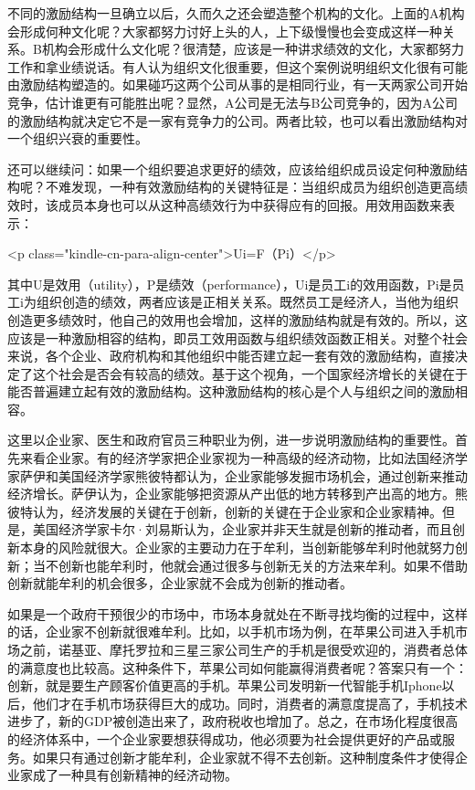 不同的激励结构一旦确立以后，久而久之还会塑造整个机构的文化。上面的A机构会形成何种文化呢？大家都努力讨好上头的人，上下级慢慢也会变成这样一种关系。B机构会形成什么文化呢？很清楚，应该是一种讲求绩效的文化，大家都努力工作和拿业绩说话。有人认为组织文化很重要，但这个案例说明组织文化很有可能由激励结构塑造的。如果碰巧这两个公司从事的是相同行业，有一天两家公司开始竞争，估计谁更有可能胜出呢？显然，A公司是无法与B公司竞争的，因为A公司的激励结构就决定它不是一家有竞争力的公司。两者比较，也可以看出激励结构对一个组织兴衰的重要性。

还可以继续问：如果一个组织要追求更好的绩效，应该给组织成员设定何种激励结构呢？不难发现，一种有效激励结构的关键特征是：当组织成员为组织创造更高绩效时，该成员本身也可以从这种高绩效行为中获得应有的回报。用效用函数来表示：

<p class="kindle-cn-para-align-center">Ui=F（Pi）</p>

其中U是效用（utility），P是绩效（performance），Ui是员工i的效用函数，Pi是员工i为组织创造的绩效，两者应该是正相关关系。既然员工是经济人，当他为组织创造更多绩效时，他自己的效用也会增加，这样的激励结构就是有效的。所以，这应该是一种激励相容的结构，即员工效用函数与组织绩效函数正相关。对整个社会来说，各个企业、政府机构和其他组织中能否建立起一套有效的激励结构，直接决定了这个社会是否会有较高的绩效。基于这个视角，一个国家经济增长的关键在于能否普遍建立起有效的激励结构。这种激励结构的核心是个人与组织之间的激励相容。

这里以企业家、医生和政府官员三种职业为例，进一步说明激励结构的重要性。首先来看企业家。有的经济学家把企业家视为一种高级的经济动物，比如法国经济学家萨伊和美国经济学家熊彼特都认为，企业家能够发掘市场机会，通过创新来推动经济增长。萨伊认为，企业家能够把资源从产出低的地方转移到产出高的地方。熊彼特认为，经济发展的关键在于创新，创新的关键在于企业家和企业家精神。但是，美国经济学家卡尔·刘易斯认为，企业家并非天生就是创新的推动者，而且创新本身的风险就很大。企业家的主要动力在于牟利，当创新能够牟利时他就努力创新；当不创新也能牟利时，他就会通过很多与创新无关的方法来牟利。如果不借助创新就能牟利的机会很多，企业家就不会成为创新的推动者。

如果是一个政府干预很少的市场中，市场本身就处在不断寻找均衡的过程中，这样的话，企业家不创新就很难牟利。比如，以手机市场为例，在苹果公司进入手机市场之前，诺基亚、摩托罗拉和三星三家公司生产的手机是很受欢迎的，消费者总体的满意度也比较高。这种条件下，苹果公司如何能赢得消费者呢？答案只有一个：创新，就是要生产顾客价值更高的手机。苹果公司发明新一代智能手机Iphone以后，他们才在手机市场获得巨大的成功。同时，消费者的满意度提高了，手机技术进步了，新的GDP被创造出来了，政府税收也增加了。总之，在市场化程度很高的经济体系中，一个企业家要想获得成功，他必须要为社会提供更好的产品或服务。如果只有通过创新才能牟利，企业家就不得不去创新。这种制度条件才使得企业家成了一种具有创新精神的经济动物。

